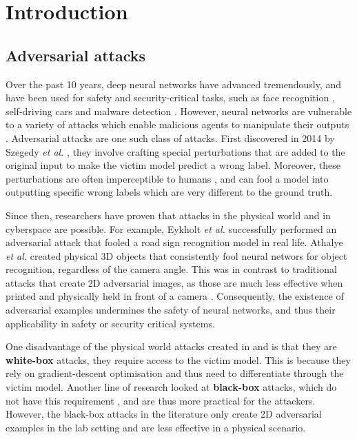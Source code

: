 \chapter{Introduction}
	\label{chap:intro}
	
\section{Adversarial attacks}
    \label{sec:introduction}

Over the past 10 years, deep neural networks have advanced tremendously, and have been used for safety and security-critical tasks, such as face recognition \cite{face_recognition}, self-driving cars \cite{self_driving_cars} and malware detection \cite{malware_detection}. However, neural networks are vulnerable to a variety of attacks which enable malicious agents to manipulate their outputs \cite{deep_leakage, trojan_attacks, poisoning_attacks, szegedy2014intriguing}. Adversarial attacks are one such class of attacks. First discovered in 2014 by Szegedy \textit{et al.} \cite{szegedy2014intriguing}, they involve crafting special perturbations that are added to the original input to make the victim model predict a wrong label. Moreover, these perturbations are often imperceptible to humans \cite{szegedy2014intriguing}, and can fool a model into outputting specific wrong labels which are very different to the ground truth.

Since then, researchers have proven that attacks in the physical world \cite{evtimov_road_signs} and in cyberspace \cite{papernot_cyberspace_attack} are possible. For example, Eykholt \textit{et al.} \cite{evtimov_road_signs} successfully performed an adversarial attack that fooled a road sign recognition model in real life. Athalye \textit{et al.} \cite{athalye} created physical 3D objects that consistently fool neural networs for object recognition, regardless of the camera angle. This was in contrast to traditional attacks that create 2D adversarial images, as those are much less effective when printed and physically held in front of a camera \cite{lu_physical_experiments}. Consequently, the existence of adversarial examples undermines the safety of neural networks, and thus their applicability in safety or security critical systems.

One disadvantage of the physical world attacks created in \cite{athalye} and \cite{evtimov_road_signs} is that they are \textbf{white-box} attacks, they require access to the victim model. This is because they rely on gradient-descent optimisation and thus need to differentiate through the victim model. Another line of research looked at \textbf{black-box} attacks, which do not have this requirement \cite{akhtar}, and are thus more practical for the attackers. However, the black-box attacks in the literature only create 2D adversarial examples in the lab setting and are less effective in a physical scenario.

